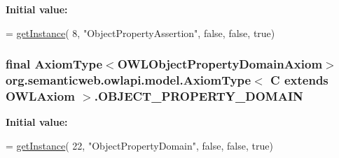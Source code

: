 {\bfseries Initial value\-:}
\begin{DoxyCode}
= \hyperlink{classorg_1_1semanticweb_1_1owlapi_1_1model_1_1_axiom_type_3_01_c_01extends_01_o_w_l_axiom_01_4_a485e011845434c518471707a87f09339}{getInstance}(
            8, \textcolor{stringliteral}{"ObjectPropertyAssertion"}, \textcolor{keyword}{false}, \textcolor{keyword}{false}, \textcolor{keyword}{true})
\end{DoxyCode}
\hypertarget{classorg_1_1semanticweb_1_1owlapi_1_1model_1_1_axiom_type_3_01_c_01extends_01_o_w_l_axiom_01_4_aed3185927f0b5611752b9028e96c600c}{
\subsubsection[{O\-B\-J\-E\-C\-T\-\_\-\-P\-R\-O\-P\-E\-R\-T\-Y\-\_\-\-D\-O\-M\-A\-I\-N}]{\setlength{\rightskip}{0pt plus 5cm}final {\bf Axiom\-Type}$<${\bf O\-W\-L\-Object\-Property\-Domain\-Axiom}$>$ org.\-semanticweb.\-owlapi.\-model.\-Axiom\-Type$<$ C extends {\bf O\-W\-L\-Axiom} $>$.O\-B\-J\-E\-C\-T\-\_\-\-P\-R\-O\-P\-E\-R\-T\-Y\-\_\-\-D\-O\-M\-A\-I\-N\hspace{0.3cm}{\ttfamily [static]}}}\label{classorg_1_1semanticweb_1_1owlapi_1_1model_1_1_axiom_type_3_01_c_01extends_01_o_w_l_axiom_01_4_aed3185927f0b5611752b9028e96c600c}
{\bfseries Initial value\-:}
\begin{DoxyCode}
= \hyperlink{classorg_1_1semanticweb_1_1owlapi_1_1model_1_1_axiom_type_3_01_c_01extends_01_o_w_l_axiom_01_4_a485e011845434c518471707a87f09339}{getInstance}(
            22, \textcolor{stringliteral}{"ObjectPropertyDomain"}, \textcolor{keyword}{false}, \textcolor{keyword}{false}, \textcolor{keyword}{true})
\end{DoxyCode}
